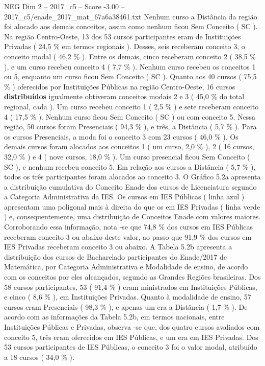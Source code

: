 \begin{textsample}{NEG Dim 2 – 2017\_c5 – Score -3.00 – 2017\_c5/enade\_2017\_mat\_67a6a38461.txt}
Nenhum curso a Distância da região foi alocado aos demais conceitos, assim como nenhum ficou Sem Conceito ( SC ).
Na região Centro-Oeste, 13 dos 53 cursos participantes eram de Instituições Privadas ( 24,5 \% em termos regionais ).
Desses, seis receberam conceito 3, o conceito modal ( 46,2 \% ).
Entre os demais, cinco receberam conceito 2 ( 38,5 \% ), e um curso recebeu conceito 4 ( 7,7 \% ).
Nenhum curso recebeu os conceitos 1 ou 5, enquanto um curso ficou Sem Conceito ( SC ).
Quanto aos 40 cursos ( 75,5 \% ) oferecidos por Instituições Públicas na região Centro-Oeste, 16 cursos \textbf{distribuídos} igualmente obtiveram conceitos modais 2 e 3 ( 45,0 \% do total regional, cada ).
Um curso recebeu conceito 1 ( 2,5 \% ) e sete receberam conceito 4 ( 17,5 \% ).
Nenhum curso ficou Sem Conceito ( SC ) ou com conceito 5.
Nessa região, 50 cursos foram Presenciais ( 94,3 \% ), e três, a Distância ( 5,7 \% ).
Para os cursos Presenciais, a moda foi o conceito 3 com 23 cursos ( 46,0 \% ).
Os demais cursos foram alocados aos conceitos 1 ( um curso, 2,0 \% ), 2 ( 16 cursos, 32,0 \% ) e 4 ( nove cursos, 18,0 \% ).
Um curso presencial ficou Sem Conceito ( SC ), e nenhum recebeu conceito 5.
Em relação aos cursos a Distância ( 5,7 \% ), todos os três participantes foram alocados ao conceito 3.
O Gráfico 5.2a apresenta a distribuição cumulativa do Conceito Enade dos cursos de Licenciatura segundo a Categoria Administrativa da IES.
Os cursos em IES Públicas ( linha azul ) apresentam uma poligonal mais à direita do que os em IES Privadas ( linha verde ) e, consequentemente, uma distribuição de Conceitos Enade com valores maiores.
Corroborando essa informação, nota -se que 74,8 \% dos cursos em IES Públicas receberam conceito 3 ou abaixo deste valor, ao passo que 91,9 \% dos cursos em IES Privadas receberam conceito 3 ou abaixo.
A Tabela 5.2b apresenta a distribuição dos cursos de Bacharelado participantes do Enade/2017 de Matemática, por Categoria Administrativa e Modalidade de ensino, de acordo com os conceitos por eles alcançados, segundo as Grandes Regiões brasileiras.
Dos 58 cursos participantes, 53 ( 91,4 \% ) eram ministrados em Instituições Públicas, e cinco ( 8,6 \% ), em Instituições Privadas.
Quanto à modalidade de ensino, 57 cursos eram Presenciais ( 98,3 \% ), e apenas um era a Distância ( 1,7 \% ).
De acordo com as informações da Tabela 5.2b, em termos nacionais, entre Instituições Públicas e Privadas, observa -se que, dos quatro cursos avaliados com conceito 5, três eram oferecidos em IES Públicas, e um era em IES Privadas.
Dos 53 cursos participantes de IES Públicas, o conceito 3 foi o valor modal, atribuído a 18 cursos ( 34,0 \% ).

\end{textsample}
